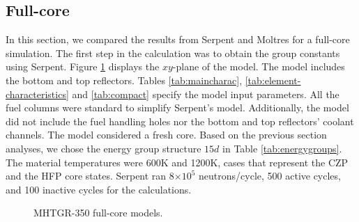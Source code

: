 \subsection{Full-core}

In this section, we compared the results from Serpent and Moltres for a full-core simulation.
The first step in the calculation was to obtain the group constants using Serpent.
Figure \ref{fig:fullcoremodel} displays the $xy$-plane of the model.
The model includes the bottom and top reflectors.
Tables \ref{tab:maincharac}, \ref{tab:element-characteristics} and \ref{tab:compact} specify the model input parameters.
All the fuel columns were standard to simplify Serpent’s model.
Additionally, the model did not include the fuel handling holes nor the bottom and top reflectors' coolant channels.
The model considered a fresh core.
Based on the previous section analyses, we chose the energy group structure $15d$ in Table \ref{tab:energygroups}.
The material temperatures were 600K and 1200K, cases that represent the \gls{CZP} and the \gls{HFP} core states.
Serpent ran 8$\times 10^5$ neutrons/cycle, 500 active cycles, and 100 inactive cycles for the calculations.

\begin{figure}[htbp!]
	\centering
	\hfill
  \caption{MHTGR-350 full-core models.}
	\label{fig:fullcoremodel}
\end{figure}

